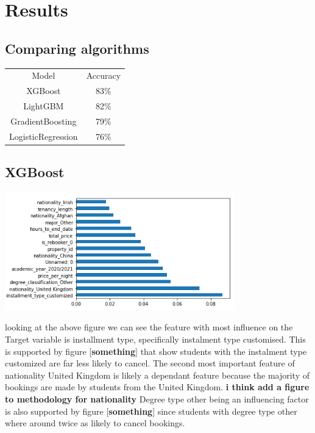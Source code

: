\chapter{Results}
\label{ch:results}
\section{Comparing algorithms}



\begin{center}
\begin{tabular}{ c c}
 Model              & Accuracy \\
XGBoost            & 83\%     \\
LightGBM           & 82\%     \\
GradientBoosting   & 79\%     \\
LogisticRegression & 76\%   
\end{tabular}
\end{center}
\section{XGBoost}

\includegraphics[width=10cm]{figures/results_features.png}

looking at the above figure we can see the feature with most influence on the Target variable is installment type, specifically instalment type customised. This is supported by figure [\textbf{something}] that show students with the instalment type customized are far less likely to cancel. The second most important feature of nationality United Kingdom is likely a dependant feature because the majority of bookings are made by students from the United Kingdom. 
\textbf{i think add a figure to methodology for nationality}
Degree type other being an influencing factor is also supported by figure [\textbf{something}] since students with degree type other where around twice as likely to cancel bookings.



